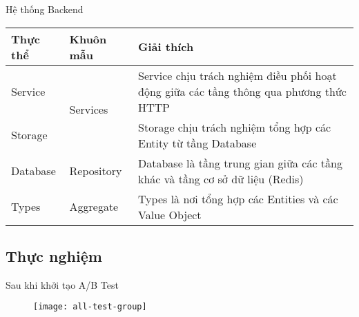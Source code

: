 \begin{frame}{Hệ thống Backend}
	\begin{table}
		\begin{tabular}{|l|l|p{7cm}|}
			\hline
			Thực thể & Khuôn mẫu                 & Giải thích                                                                             \\ \hline
			Service  & \multirow{2}{*}{Services} & Service chịu trách nghiệm điều phối hoạt động giữa các tầng thông qua phương thức HTTP \\ \cline{1-1} \cline{3-3}
			Storage  &                           & Storage chịu trách nghiệm tổng hợp các Entity từ tầng Database                         \\ \hline
			Database & Repository                & Database là tầng trung gian giữa các tầng khác và tầng cơ sở dữ liệu (Redis)           \\ \hline
			Types    & Aggregate                 & Types là nơi tổng hợp các Entities và các Value Object                                 \\ \hline
		\end{tabular}
	\end{table}
\end{frame}

\subsection{Thực nghiệm}

%
%

\begin{frame}{Sau khi khởi tạo A/B Test}
	\begin{figure}
		\centering
		\texttt{[image: all-test-group]}
	\end{figure}
\end{frame}

